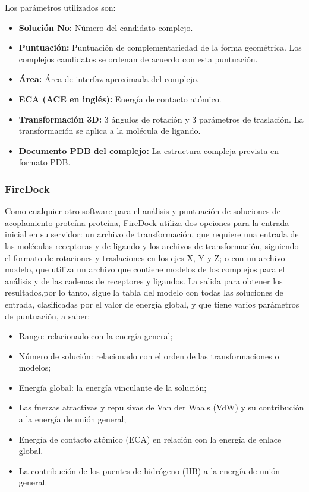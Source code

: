 \documentclass[11pt, letterpaper, spanish]{article}
\begin{document}
{{\par{Los parámetros utilizados son:}
\begin{itemize}
    \item\textbf{Solución No:} Número del candidato complejo.
    \item \textbf{Puntuación:} Puntuación de complementariedad de la forma geométrica. Los complejos candidatos se ordenan de acuerdo con esta puntuación.
    \item \textbf{Área:} Área de interfaz aproximada del complejo.
    \item\textbf{ECA (ACE en inglés):} Energía de contacto atómico.
    \item \textbf{Transformación 3D:} 3 ángulos de rotación y 3 parámetros de traslación. La transformación se aplica a la molécula de ligando.
    \item \textbf{Documento PDB del complejo:} La estructura compleja prevista en formato PDB.
\end{itemize}
\subsubsection{FireDock}
\par{ Como cualquier otro software para el análisis y puntuación de soluciones de acoplamiento proteína-proteína, FireDock utiliza dos opciones para la entrada inicial en su servidor: un archivo de transformación, que requiere una entrada de las moléculas receptoras y de ligando y los archivos de transformación, siguiendo el formato de rotaciones y traslaciones en los ejes X, Y y Z; o con un archivo modelo,  que utiliza un archivo que contiene modelos de los complejos para el análisis y de las cadenas de receptores y ligandos. La salida para obtener los resultados,por lo tanto, sigue la tabla del modelo con todas las soluciones de entrada, clasificadas por el valor de energía global, y que tiene varios parámetros de puntuación, a saber:}

\begin{itemize}
    \item Rango: relacionado con la energía general; 
    \item Número de solución: relacionado con el orden de las transformaciones o modelos; 
    \item Energía global: la energía vinculante de la solución; 
    \item Las fuerzas atractivas y repulsivas de Van der Waals (VdW) y su contribución a la energía de unión general;
    \item Energía de contacto atómico (ECA) en relación con la energía de enlace global. 
    \item La contribución de los puentes de hidrógeno (HB) a la energía de unión general.
\end{itemize}
   
}}
\end{document}
